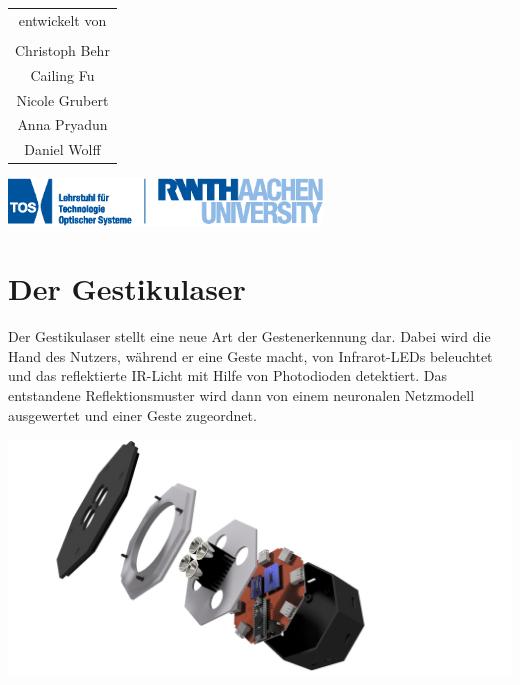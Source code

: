 \documentclass[a4paper,12pt,notumble]{leaflet}
\begin{document}
\begin{center}
\begin{tabular}{c}
	entwickelt von \\ \\
	Christoph Behr \\
	Cailing Fu \\
	Nicole Grubert \\
	Anna Pryadun \\
	Daniel Wolff
\end{tabular}

\vfill

\includegraphics[height=1.25cm]{../Logos/TOS.eps}

\end{center}

\newpage
\raggedright



\noindent
\begin{minipage}[c][0.58\textheight][t]{\textwidth}

	\section{Der Gestikulaser}

	Der Gestikulaser stellt eine neue Art der Gestenerkennung dar. Dabei wird die Hand des Nutzers, während er eine Geste macht, von Infrarot-LEDs beleuchtet und 
	das reflektierte IR-Licht mit Hilfe von Photodioden detektiert. Das entstandene Reflektionsmuster wird dann von einem neuronalen Netzmodell ausgewertet und 
	einer Geste zugeordnet. 
	
	\vspace{0.5cm}

	\centering
	\includegraphics[scale=0.3]{../CAD_Bilder/Oktokommander_raytraced.png}
	
	\vfill
	
\end{minipage}
\end{document}
